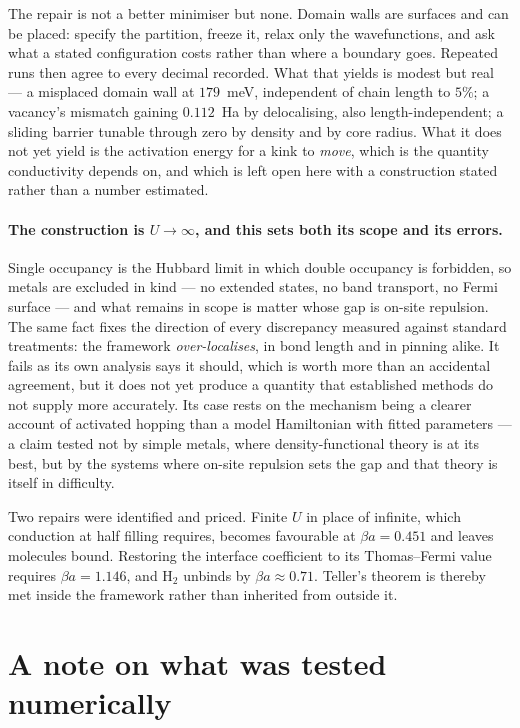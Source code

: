 \documentclass[11pt]{article}
\begin{document}
The repair is not a better minimiser but none. Domain walls are surfaces and can be placed:
specify the partition, freeze it, relax only the wavefunctions, and ask what a stated configuration
costs rather than where a boundary goes. Repeated runs then agree to every decimal recorded. What
that yields is modest but real --- a misplaced domain wall at $179$~meV, independent of chain length
to $5\%$; a vacancy's mismatch gaining $0.112$~Ha by delocalising, also length-independent; a
sliding barrier tunable through zero by density and by core radius. What it does not yet yield is
the activation energy for a kink to \emph{move}, which is the quantity conductivity depends on, and
which is left open here with a construction stated rather than a number estimated.

\paragraph{The construction is $U\to\infty$, and this sets both its scope and its errors.} Single
occupancy is the Hubbard limit in which double occupancy is forbidden, so metals are excluded in
kind --- no extended states, no band transport, no Fermi surface --- and what remains in scope is
matter whose gap is on-site repulsion. The same fact fixes the direction of every discrepancy
measured against standard treatments: the framework \emph{over-localises}, in bond length and in
pinning alike. It fails as its own analysis says it should, which is worth more than an accidental
agreement, but it does not yet produce a quantity that established methods do not supply more
accurately. Its case rests on the mechanism being a clearer account of activated hopping than a
model Hamiltonian with fitted parameters --- a claim tested not by simple metals, where
density-functional theory is at its best, but by the systems where on-site repulsion sets the gap
and that theory is itself in difficulty.

Two repairs were identified and priced. Finite $U$ in place of infinite, which conduction at half
filling requires, becomes favourable at $\beta a=0.451$ and leaves molecules bound. Restoring the
interface coefficient to its Thomas--Fermi value requires $\beta a=1.146$, and $\mathrm{H}_2$
unbinds by $\beta a\approx0.71$. Teller's theorem is thereby met inside the framework rather than
inherited from outside it.

\section*{A note on what was tested numerically}
\end{document}
